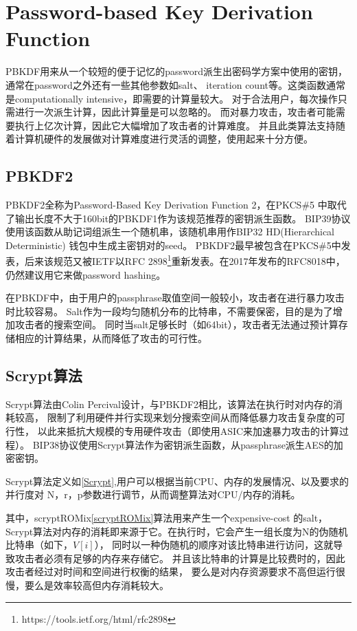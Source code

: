 \section{Password-based Key Derivation Function}
PBKDF用来从一个较短的便于记忆的password派生出密码学方案中使用的密钥，通常在password之外还有一些其他参数如salt、
iteration count等。这类函数通常是computationally intensive，即需要的计算量较大。
对于合法用户，每次操作只需进行一次派生计算，因此计算量是可以忽略的。
而对暴力攻击，攻击者可能需要执行上亿次计算，因此它大幅增加了攻击者的计算难度。
并且此类算法支持随着计算机硬件的发展做对计算难度进行灵活的调整，使用起来十分方便。

\subsection{PBKDF2}
PBKDF2全称为Password-Based Key Derivation Function 2，在PKCS\#5
中取代了输出长度不大于160bit的PBKDF1作为该规范推荐的密钥派生函数。
BIP39协议使用该函数从助记词组派生一个随机串，该随机串用作BIP32 HD(Hierarchical Deterministic)
钱包中生成主密钥对的seed。  PBKDF2最早被包含在PKCS\#5中发表，后来该规范又被IETF以RFC 2898\footnote{https://tools.ietf.org/html/rfc2898}重新发表。在2017年发布的RFC8018中，仍然建议用它来做password hashing。

在PBKDF中，由于用户的passphrase取值空间一般较小，攻击者在进行暴力攻击时比较容易。
Salt作为一段均匀随机分布的比特串，不需要保密，目的是为了增加攻击者的搜索空间。
同时当salt足够长时（如64bit），攻击者无法通过预计算存储相应的计算结果，从而降低了攻击的可行性。

\subsection{Scrypt算法}
Scrypt算法由Colin Percival设计，与PBKDF2相比，该算法在执行时对内存的消耗较高，
限制了利用硬件并行实现来划分搜索空间从而降低暴力攻击复杂度的可行性，
以此来抵抗大规模的专用硬件攻击（即使用ASIC来加速暴力攻击的计算过程）。
BIP38协议使用Scrypt算法作为密钥派生函数，从passphrase派生AES的加密密钥。 
 
Scrypt算法定义如\ref{Scrypt},用户可以根据当前CPU、内存的发展情况、以及要求的并行度对
N，r，p参数进行调节，从而调整算法对CPU/内存的消耗。

其中，scryptROMix\ref{scryptROMix}算法用来产生一个expensive-cost 的salt，Scrypt算法对内存的消耗即来源于它。在执行时，它会产生一组长度为N的伪随机比特串（如下，$V[i]$），
同时以一种伪随机的顺序对该比特串进行访问，这就导致攻击者必须有足够的内存来存储它。
并且该比特串的计算是比较费时的，因此攻击者经过对时间和空间进行权衡的结果，
要么是对内存资源要求不高但运行很慢，要么是效率较高但内存消耗较大。

